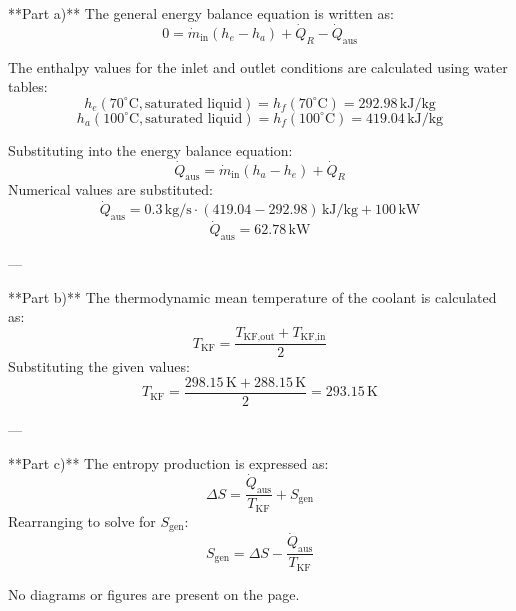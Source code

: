 **Part a)**  
The general energy balance equation is written as:  
\[
0 = \dot{m}_{\text{in}} (h_e - h_a) + \dot{Q}_R - \dot{Q}_{\text{aus}}
\]  

The enthalpy values for the inlet and outlet conditions are calculated using water tables:  
\[
h_e(70^\circ\text{C}, \text{saturated liquid}) = h_f(70^\circ\text{C}) = 292.98 \, \text{kJ/kg}
\]  
\[
h_a(100^\circ\text{C}, \text{saturated liquid}) = h_f(100^\circ\text{C}) = 419.04 \, \text{kJ/kg}
\]  

Substituting into the energy balance equation:  
\[
\dot{Q}_{\text{aus}} = \dot{m}_{\text{in}} (h_a - h_e) + \dot{Q}_R
\]  
Numerical values are substituted:  
\[
\dot{Q}_{\text{aus}} = 0.3 \, \text{kg/s} \cdot (419.04 - 292.98) \, \text{kJ/kg} + 100 \, \text{kW}
\]  
\[
\dot{Q}_{\text{aus}} = 62.78 \, \text{kW}
\]  

---

**Part b)**  
The thermodynamic mean temperature of the coolant is calculated as:  
\[
T_{\text{KF}} = \frac{T_{\text{KF,out}} + T_{\text{KF,in}}}{2}
\]  
Substituting the given values:  
\[
T_{\text{KF}} = \frac{298.15 \, \text{K} + 288.15 \, \text{K}}{2} = 293.15 \, \text{K}
\]  

---

**Part c)**  
The entropy production is expressed as:  
\[
\Delta S = \frac{\dot{Q}_{\text{aus}}}{T_{\text{KF}}} + S_{\text{gen}}
\]  
Rearranging to solve for \( S_{\text{gen}} \):  
\[
S_{\text{gen}} = \Delta S - \frac{\dot{Q}_{\text{aus}}}{T_{\text{KF}}}
\]  

No diagrams or figures are present on the page.